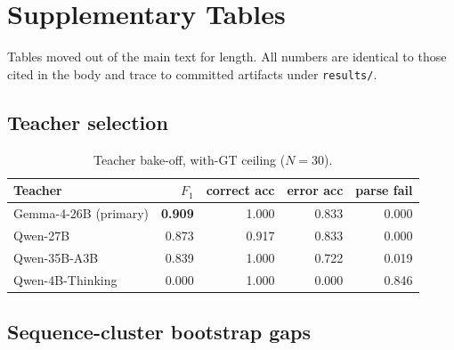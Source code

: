 \documentclass{article}
\begin{document}
\appendix

\section{Supplementary Tables}
\label{app:tables}

Tables moved out of the main text for length. All numbers are identical to
those cited in the body and trace to committed artifacts under
\texttt{results/}.

\subsection{Teacher selection}
\label{app:bakeoff}

\begin{table}[t]
\centering
\small
\begin{tabular}{lrrrr}
\toprule
Teacher & $F_1$ & correct acc & error acc & parse fail \\
\midrule
Gemma-4-26B (primary) & \textbf{0.909} & 1.000 & 0.833 & 0.000 \\
Qwen-27B & 0.873 & 0.917 & 0.833 & 0.000 \\
Qwen-35B-A3B & 0.839 & 1.000 & 0.722 & 0.019 \\
Qwen-4B-Thinking & 0.000 & 1.000 & 0.000 & 0.846 \\
\bottomrule
\end{tabular}
\caption{Teacher bake-off, with-GT ceiling ($N=30$).}
\label{tab:teacher-bakeoff}
\end{table}

\subsection{Sequence-cluster bootstrap gaps}
\label{app:bootstrap}
\end{document}
